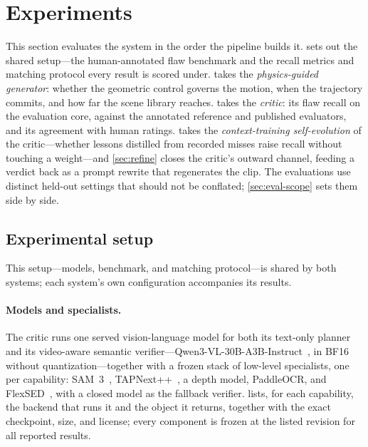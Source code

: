 \section{Experiments}\label{sec:experiments}

This section evaluates the system in the order the pipeline builds it.  sets out
the shared setup---the human-annotated flaw benchmark and the recall metrics and matching protocol
every result is scored under.  takes the \emph{physics-guided generator}:
whether the geometric control governs the motion, when the trajectory commits, and how far the scene
library reaches.  takes the \emph{\PhyReAct{} critic}: its flaw recall on the
evaluation core, against the annotated reference and published evaluators, and its agreement with
human ratings.  takes the \emph{context-training self-evolution} of the
critic---whether lessons distilled from recorded misses raise recall without touching a
weight---and \cref{sec:refine} closes the critic's outward channel, feeding a verdict back as a
prompt rewrite that regenerates the clip. The evaluations use distinct held-out settings that should
not be conflated; \cref{sec:eval-scope} sets them side by side.

\subsection{Experimental setup}\label{sec:dataset}
This setup---models, benchmark, and matching protocol---is shared by both systems; each system's own configuration accompanies its results.

\paragraph{Models and specialists.} The critic runs one served vision-language model for both its text-only planner and its video-aware semantic verifier---Qwen3-VL-30B-A3B-Instruct~\cite{qwen3vl2025}, in BF16 without quantization---together with a frozen stack of low-level specialists, one per capability: SAM~3~\cite{sam3_2025}, TAPNext++~\cite{tapnext2025}, a depth model, PaddleOCR, and FlexSED~\cite{flexsed2025}, with a closed model as the fallback verifier.  lists, for each capability, the backend that runs it and the object it returns, together with the exact checkpoint, size, and license; every component is frozen at the listed revision for all reported results.

